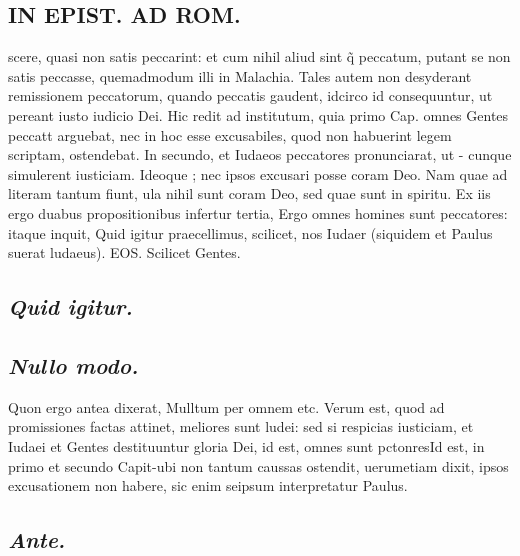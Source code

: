 \documentclass{article}
\begin{document}
\begin{pages}
\section*{ IN EPIST. AD ROM.  }
\marginpar{[ p.]}\pstart scere, quasi non satis peccarint: et cum nihil aliud sint q̃ peccatum, putant se non satis peccasse, quemadmodum illi in Malachia. Tales autem non desyderant remissionem peccatorum, quando peccatis gaudent, idcirco id consequuntur, ut pereant iusto iudicio Dei.   \pend\pstart Hic redit ad institutum, quia primo Cap. omnes Gentes peccatt arguebat, nec in hoc esse excusabiles, quod non habuerint legem scriptam, ostendebat. In secundo, et Iudaeos peccatores pronunciarat, ut - cunque simulerent iusticiam. Ideoque ; nec ipsos excusari posse coram Deo. Nam quae ad literam tantum fiunt, ula nihil sunt coram Deo, sed quae sunt in spiritu. Ex iis ergo duabus propositionibus infertur tertia, Ergo omnes homines sunt peccatores: itaque inquit, Quid igitur praecellimus, scilicet, nos Iudaer (siquidem et Paulus suerat ludaeus). EOS. Scilicet Gentes.   \pend
{}
{}
\subsection*{\textit{Quid igitur. }}
{}
\subsection*{\textit{Nullo modo. }}\pstart Quon ergo antea dixerat, Mulltum per omnem etc.  Verum est, quod ad promissiones factas attinet, meliores sunt ludei: sed si respicias iusticiam, et Iudaei et Gentes destituuntur gloria Dei, id est, omnes sunt pctonres\pend\pstart Id est, in primo et secundo Capit-ubi non tantum caussas ostendit, uerumetiam dixit, ipsos excusationem non habere, sic enim seipsum interpretatur Paulus.   \pend
{}
{}
\subsection*{\textit{Ante. }}

\end{pages}
\end{document}
